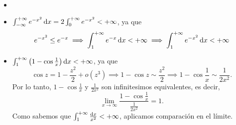 \begin{example*}
    \begin{itemize}
        \item[]
        \item $\int^{+\infty}_{-\infty} e^{-x^2} \dif x = 2
                \int^{+\infty}_0 e^{-x^2} < +\infty$, ya que 
            \[
                e^{-x^2} \leq e^{-x} \implies \int^{+\infty}_1 e^{-x}
                \dif x < +\infty \implies \int^{+\infty}_1 e^{-x^2}
                \dif x < +\infty
            \]
        \item $\int^{+\infty}_1 \left( 1 - \cos \frac{1}{x} \right)
                \dif x < +\infty$, ya que
            \[
                \cos z = 1 - \frac{z^2}{2} + o(z^3) \implies
                1-\cos z \sim \frac{z^2}{2} \implies
                1-\cos \frac{1}{x} \sim \frac{1}{2x^2}.
            \]
            Por lo tanto, $1-\cos \frac{1}{x}$ y $\frac{1}{2x^2}$ son 
            infinitesimos equivalentes, es decir,
            \[
                \lim_{x \to \infty} \frac{1-\cos \frac{1}{x}}
                {\frac{1}{2x^2}} = 1.
            \]
            Como sabemos que $\huge\int^{+\infty}_1 \frac{\dif x}{x^2} <
            +\infty$, aplicamos comparación en el límite.
    \end{itemize}
\end{example*}


